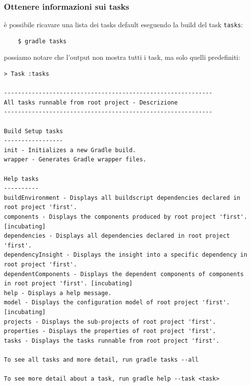 \documentclass{article}
\begin{document}
\begin{flushleft}
\subsubsection{Ottenere informazioni sui tasks} è possibile ricavare una lista dei tasks default eseguendo la build del task \texttt{tasks}:
\begin{verbatim}
    $ gradle tasks \end{verbatim}
possiamo notare che l'output non mostra tutti i task, ma solo quelli predefiniti:
\begin{verbatim}
> Task :tasks 

------------------------------------------------------------
All tasks runnable from root project - Descrizione
------------------------------------------------------------

Build Setup tasks
-----------------
init - Initializes a new Gradle build.
wrapper - Generates Gradle wrapper files.

Help tasks
----------
buildEnvironment - Displays all buildscript dependencies declared in root project 'first'.
components - Displays the components produced by root project 'first'. [incubating]
dependencies - Displays all dependencies declared in root project 'first'.
dependencyInsight - Displays the insight into a specific dependency in root project 'first'.
dependentComponents - Displays the dependent components of components in root project 'first'. [incubating]
help - Displays a help message.
model - Displays the configuration model of root project 'first'. [incubating]
projects - Displays the sub-projects of root project 'first'.
properties - Displays the properties of root project 'first'.
tasks - Displays the tasks runnable from root project 'first'.

To see all tasks and more detail, run gradle tasks --all

To see more detail about a task, run gradle help --task <task>



\end{verbatim}
\end{flushleft}
\end{document}
